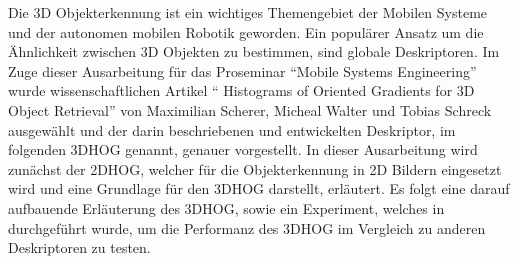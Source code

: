 Die 3D Objekterkennung ist ein wichtiges Themengebiet der Mobilen Systeme und der autonomen mobilen Robotik geworden.
Ein populärer Ansatz um die Ähnlichkeit zwischen 3D Objekten zu bestimmen, sind globale Deskriptoren. Im Zuge
dieser Ausarbeitung für das Proseminar "`Mobile Systems Engineering"' wurde wissenschaftlichen Artikel 
"` Histograms of Oriented Gradients for 3D Object Retrieval"' von  Maximilian Scherer, Micheal Walter und Tobias Schreck 
ausgewählt und der darin beschriebenen und entwickelten  Deskriptor, im folgenden 3DHOG genannt, genauer vorgestellt.
In dieser Ausarbeitung wird zunächst der 2DHOG, welcher für die Objekterkennung in 2D Bildern eingesetzt wird und eine Grundlage
für den 3DHOG darstellt, erläutert. Es folgt eine darauf aufbauende Erläuterung des 3DHOG, sowie ein Experiment, welches in \cite{scherer2010histograms}
durchgeführt wurde, um die Performanz des 3DHOG im Vergleich zu anderen Deskriptoren zu testen.
